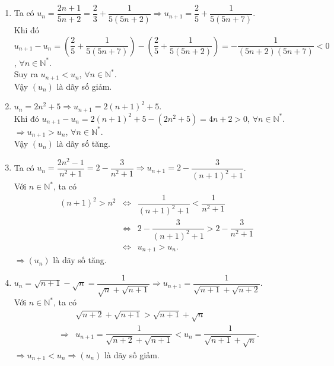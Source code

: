 \begin{ex}
{\begin{enumerate}
\begin{eqnarray*}
				 u_{n+1}-u_n&=&\left(1-\dfrac{2}{n+2}\right)-\left(1-\dfrac{2}{n+1}\right)\\
				 &=&\dfrac{2}{(n+1)(n+2)}>0.
			\end{eqnarray*}
			Suy ra $u_{n+1}>u_n$, $\forall n\in\mathbb{N}^*$.\\ 
			Vậy dãy số $\left(u_n\right)$ là dãy  số tăng.
			\item Ta có $u_n=\dfrac{2  n+1}{5 n+2}=\dfrac{2}{3}+\dfrac{1}{5(5 n+2)} \Rightarrow u_{n+1}=\dfrac{2}{5}+\dfrac{1}{5(5 n+7)}$.\\
			Khi đó $u_{n+1}-u_n=\left(\dfrac{2}{5}+\dfrac{1}{5(5 n+7)}\right)-\left(\dfrac{2}{5}+\dfrac{1}{5(5 n+2)}\right)=-\dfrac{1}{(5 n+2)(5 n+7)}<0$, $\forall n\in\mathbb{N}^*$.\\ 
			Suy ra $u_{n+1}<u_n$, $\forall  n\in\mathbb{N}^*$.\\
			Vậy $\left(u_n\right)$ là dãy số  giảm.
			\item  $u_n=2 n^2+5 \Rightarrow u_{n+1}=2(n+1)^2+5$.\\
			Khi đó  $u_{n+1}-u_n=2(n+1)^2+5-\left(2 n^2+5\right)=4 n+2>0$, $\forall n\in\mathbb{N}^*$.\\
			$\Rightarrow u_{n+1}>u_n$, $\forall n\in\mathbb{N}^*$.\\ Vậy $\left(u_n\right)$ là dãy  số tăng.
			 \item Ta có $u_n=\dfrac{2 n^2-1}{n^2+1}=2-\dfrac{3}{n^2+1} \Rightarrow u_{n+1}=2-\dfrac{3}{(n+1)^2+1}$.\\
			Với $n \in \mathbb{N}^*$,  ta có
			 \allowdisplaybreaks
			\begin{eqnarray*}
				(n+1)^2>n^2 &\Leftrightarrow&  \dfrac{1}{(n+1)^2+1}<\dfrac{1}{n^2+1} \\
				&\Leftrightarrow& 2-\dfrac{3}{(n+1)^2+1}>2-\dfrac{3}{n^2+1}\\ &\Leftrightarrow& u_{n+1}>u_n. 
			\end{eqnarray*}
			$\Rightarrow\left(u_n\right)$ là dãy số tăng. 
			\item $u_n=\sqrt{n+1}-\sqrt{n}=\dfrac{1}{\sqrt{n}+\sqrt{n+1}} \Rightarrow u_{n+1}=\dfrac{1}{\sqrt{n+1}+\sqrt{n+2}}$.\\ 
			Với $n \in \mathbb{N}^*$, ta có 
			\allowdisplaybreaks 
			\begin{eqnarray*}
				&&\sqrt{n+2}+\sqrt{n+1}>\sqrt{n+1}+\sqrt{n}\\ 
				&\Rightarrow&  u_{n+1}=\dfrac{1}{\sqrt{n+2}+\sqrt{n+1}}<u_n=\dfrac{1}{\sqrt{n+1}+\sqrt{n}}.
			\end{eqnarray*}
			 $\Rightarrow u_{n+1}<u_n \Rightarrow\left(u_n\right)$ là dãy số giảm.

\end{enumerate}}
\end{ex}
